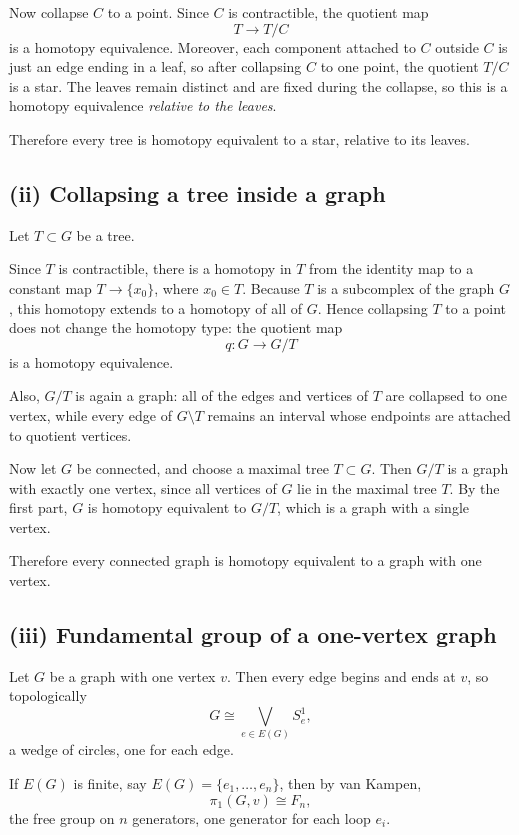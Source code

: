 \documentclass[12pt,a4paper]{article}
\theoremstyle{notespace}
\begin{document}
Now collapse \(C\) to a point. Since \(C\) is contractible, the quotient map
\[
T \longrightarrow T/C
\]
is a homotopy equivalence. Moreover, each component attached to \(C\) outside \(C\) is just an edge ending in a leaf, so after collapsing \(C\) to one point, the quotient \(T/C\) is a star. The leaves remain distinct and are fixed during the collapse, so this is a homotopy equivalence \emph{relative to the leaves}.

Therefore every tree is homotopy equivalent to a star, relative to its leaves.

\subsection*{(ii) Collapsing a tree inside a graph}
Let \(T\subset G\) be a tree.

Since \(T\) is contractible, there is a homotopy in \(T\) from the identity map to a constant map \(T\to \{x_0\}\), where \(x_0\in T\). Because \(T\) is a subcomplex of the graph \(G\), this homotopy extends to a homotopy of all of \(G\). Hence collapsing \(T\) to a point does not change the homotopy type: the quotient map
\[
q:G\longrightarrow G/T
\]
is a homotopy equivalence.

Also, \(G/T\) is again a graph: all of the edges and vertices of \(T\) are collapsed to one vertex, while every edge of \(G\setminus T\) remains an interval whose endpoints are attached to quotient vertices.

Now let \(G\) be connected, and choose a maximal tree \(T\subset G\). Then \(G/T\) is a graph with exactly one vertex, since all vertices of \(G\) lie in the maximal tree \(T\). By the first part, \(G\) is homotopy equivalent to \(G/T\), which is a graph with a single vertex.

Therefore every connected graph is homotopy equivalent to a graph with one vertex.

\subsection*{(iii) Fundamental group of a one-vertex graph}
Let \(G\) be a graph with one vertex \(v\). Then every edge begins and ends at \(v\), so topologically
\[
G \cong \bigvee_{e\in E(G)} S^1_e,
\]
a wedge of circles, one for each edge.

If \(E(G)\) is finite, say \(E(G)=\{e_1,\dots,e_n\}\), then by van Kampen,
\[
\pi_1(G,v)\cong F_n,
\]
the free group on \(n\) generators, one generator for each loop \(e_i\).
\end{document}
